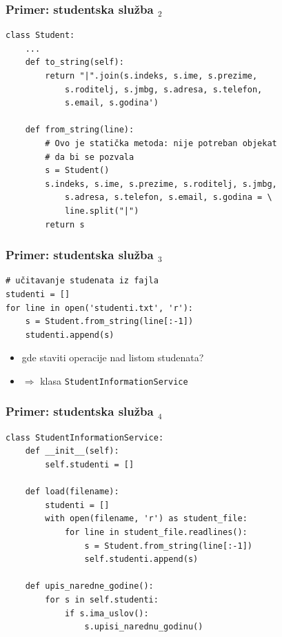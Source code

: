 \documentclass[utf8,compress,aspectratio=169]{beamer}
\begin{document}
\begin{frame}[fragile,shrink=10]
  \frametitle{Primer: studentska služba $_2$}
\begin{verbatim}
class Student:
    ...
    def to_string(self):
        return "|".join(s.indeks, s.ime, s.prezime,
            s.roditelj, s.jmbg, s.adresa, s.telefon,
            s.email, s.godina')

    def from_string(line):
        # Ovo je statička metoda: nije potreban objekat
        # da bi se pozvala
        s = Student()
        s.indeks, s.ime, s.prezime, s.roditelj, s.jmbg,
            s.adresa, s.telefon, s.email, s.godina = \
            line.split("|")
        return s
\end{verbatim}
\end{frame}

\begin{frame}[fragile]
  \frametitle{Primer: studentska služba $_3$}
\begin{verbatim}
# učitavanje studenata iz fajla
studenti = []
for line in open('studenti.txt', 'r'):
    s = Student.from_string(line[:-1])
    studenti.append(s)
\end{verbatim}
  \begin{itemize}
    \item gde staviti operacije nad listom studenata?
    \item $\Rightarrow$ klasa \texttt{StudentInformationService}
  \end{itemize}
\end{frame}

\begin{frame}[fragile]
  \frametitle{Primer: studentska služba $_4$}
\begin{verbatim}
class StudentInformationService:
    def __init__(self):
        self.studenti = []

    def load(filename):
        studenti = []
        with open(filename, 'r') as student_file:
            for line in student_file.readlines():
                s = Student.from_string(line[:-1])
                self.studenti.append(s)

    def upis_naredne_godine():
        for s in self.studenti:
            if s.ima_uslov():
                s.upisi_narednu_godinu()
\end{verbatim}
\end{frame}
\end{document}
